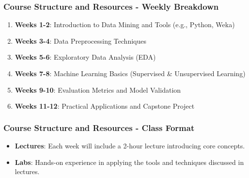 \documentclass{beamer}
\begin{document}
\begin{frame}[fragile]
    \frametitle{Course Structure and Resources - Weekly Breakdown}
    \begin{enumerate}
        \item \textbf{Weeks 1-2}: Introduction to Data Mining and Tools (e.g., Python, Weka)
        \item \textbf{Weeks 3-4}: Data Preprocessing Techniques
        \item \textbf{Weeks 5-6}: Exploratory Data Analysis (EDA)
        \item \textbf{Weeks 7-8}: Machine Learning Basics (Supervised \& Unsupervised Learning)
        \item \textbf{Weeks 9-10}: Evaluation Metrics and Model Validation
        \item \textbf{Weeks 11-12}: Practical Applications and Capstone Project
    \end{enumerate}
\end{frame}

\begin{frame}[fragile]
    \frametitle{Course Structure and Resources - Class Format}
    \begin{itemize}
        \item \textbf{Lectures}: Each week will include a 2-hour lecture introducing core concepts.
        \item \textbf{Labs}: Hands-on experience in applying the tools and techniques discussed in lectures.
    \end{itemize}
\end{frame}
\end{document}
